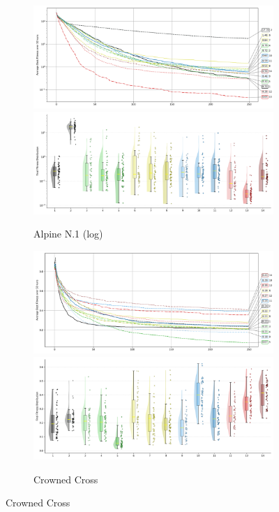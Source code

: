 \begin{figure}[p]
\renewcommand\thesubfigure{C.\arabic{figure}.\arabic{subfigure}} %

    \centering
\begin{subfigure}{1\textwidth}
    \centering
    \includegraphics[width=.49\textwidth]{Figures/results/100/Alpine_N1_All_selected_algorithms_dim100_annot_legend.png}
    \includegraphics[width=.49\textwidth]{Figures/results/100/Alpine_N1_all_dim100_raincloud_vertical.png}
    \caption{Alpine N.1 (log)}
\end{subfigure}

\begin{subfigure}{1\textwidth}
    \centering
    \includegraphics[width=.49\textwidth]{Figures/results/100/Crowned_Cross_All_selected_algorithms_dim100_annot_legend.png}
    \includegraphics[width=.49\textwidth]{Figures/results/100/Crowned_Cross_all_dim100_raincloud_vertical.png}
    \caption{Crowned Cross}
\end{subfigure}


\end{figure}
